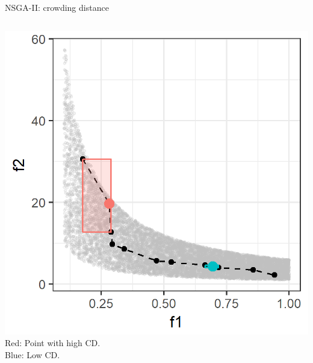 \documentclass[11pt,compress,t,notes=noshow, xcolor=table]{beamer}
\begin{document}
\begin{vbframe}{NSGA-II: crowding distance}
\begin{columns}
\begin{column}{0.4\textwidth}
\begin{center}
\includegraphics[width = 0.9\linewidth]{figure_man/NSGA2_CS2.png}
\vspace{0.2cm}
\footnotesize{Red: Point with high CD.\\ Blue: Low CD.}
\end{center}
\end{column}
\end{columns}

\end{vbframe}

\end{document}
